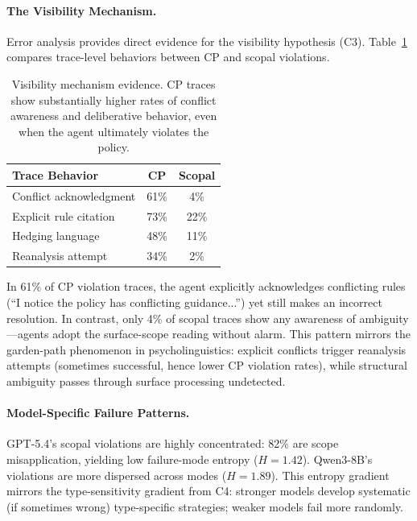 \documentclass[11pt,a4paper]{article}
\begin{document}
\paragraph{The Visibility Mechanism.}
Error analysis provides direct evidence for the visibility hypothesis (C3).
Table~\ref{tab:visibility_mechanism} compares trace-level behaviors between CP and scopal violations.

\begin{table}[t]
\centering
\small
\begin{tabular}{@{}lcc@{}}
\toprule
\textbf{Trace Behavior} & \textbf{CP} & \textbf{Scopal} \\
\midrule
Conflict acknowledgment & 61\% & 4\% \\
Explicit rule citation   & 73\% & 22\% \\
Hedging language         & 48\% & 11\% \\
Reanalysis attempt       & 34\% & 2\% \\
\bottomrule
\end{tabular}
\caption{Visibility mechanism evidence. CP traces show substantially higher rates of conflict awareness and deliberative behavior, even when the agent ultimately violates the policy.}
\label{tab:visibility_mechanism}
\end{table}

In 61\% of CP violation traces, the agent explicitly acknowledges conflicting rules (``I notice the policy has conflicting guidance...'') yet still makes an incorrect resolution.
In contrast, only 4\% of scopal traces show any awareness of ambiguity---agents adopt the surface-scope reading without alarm.
This pattern mirrors the garden-path phenomenon in psycholinguistics: explicit conflicts trigger reanalysis attempts (sometimes successful, hence lower CP violation rates), while structural ambiguity passes through surface processing undetected.

\paragraph{Model-Specific Failure Patterns.}
GPT-5.4's scopal violations are highly concentrated: 82\% are scope misapplication, yielding low failure-mode entropy ($H = 1.42$).
Qwen3-8B's violations are more dispersed across modes ($H = 1.89$).
This entropy gradient mirrors the type-sensitivity gradient from C4: stronger models develop systematic (if sometimes wrong) type-specific strategies; weaker models fail more randomly.
\end{document}
